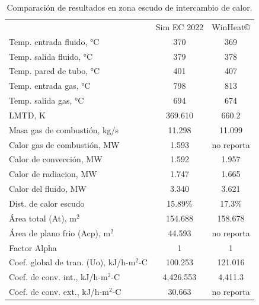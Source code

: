 \begin{table}
\begin{center}
\caption[Resultados en zona escudo de intercambio de calor]{Comparación de resultados en zona escudo de intercambio de calor.}
\label{tbl:compara-ze}
\begin{tabular}{l|c|c}
	& Sim EC 2022 & WinHeat\copyright \\
Temp. entrada fluido, °C		& 370 & 369	\\
Temp. salida fluido, °C			& 379 & 378	\\
Temp. pared de tubo, °C			& 401 & 407	\\
Temp. entrada gas, °C			& 798 & 813	\\
Temp. salida gas, °C			& 694 & 674	\\
LMTD, K							& 369.610 & 660.2 \\

Masa gas de combustión, kg/s	& 11.298 & 11.099	\\

Calor gas de combustión, MW		& 1.593 & no reporta \\
Calor de convección, MW			& 1.592 & 1.957	\\
Calor de radiacion, MW			& 1.747 & 1.665	\\
Calor del fluido, MW			& 3.340 & 3.621	\\

Dist. de calor escudo			& 15.89\% &  17.3\% \\

Área total (At), m$^2$				& 154.688 & 158.678 \\
Área de plano frio (Acp), m$^2$		& 44.593 & no reporta \\
Factor Alpha						& 1 & 1 \\

Coef. global de tran. (Uo), kJ/h-m$^2$-C	& 100.253  & 121.016 \\
Coef. de conv. int., kJ/h-m$^2$-C	& 4,426.553 & 4,411.3 \\
Coef. de conv. ext., kJ/h-m$^2$-C	& 30.663 & no reporta \\
\end{tabular}
\end{center}
\end{table}

